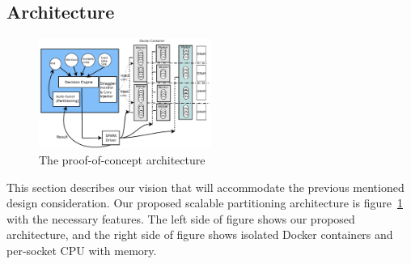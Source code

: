 

\subsection{Architecture}

\begin{figure}[tb]
  \begin{center}
     \includegraphics[width=0.5\textwidth]{fig/jaildocker}
  \end{center}
  \caption{The proof-of-concept architecture}
  \label{fig:basic}
\end{figure}

This section describes our vision that will accommodate the previous
mentioned design consideration.
Our proposed scalable partitioning architecture is figure~\ref{fig:basic} with the
necessary features.
The left side of figure shows our proposed architecture, and the right side of
figure shows isolated Docker containers and per-socket CPU with memory.

